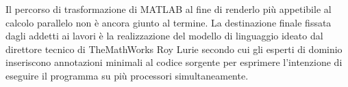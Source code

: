 Il percorso di trasformazione di MATLAB al fine di renderlo pi\`u appetibile al calcolo parallelo non \`e ancora giunto al termine. \newline La destinazione finale fissata 
dagli addetti ai lavori \`e la realizzazione del modello di linguaggio ideato dal direttore tecnico di TheMathWorks Roy Lurie \cite{Lurie2007}
secondo cui gli esperti di dominio inseriscono annotazioni minimali al codice sorgente per esprimere l'intenzione di eseguire il programma 
su pi\`u processori simultaneamente.